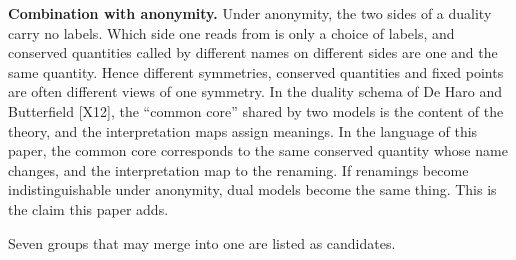 \documentclass[
  a4paper,
]{article}
\begin{document}
\textbf{Combination with anonymity.} Under anonymity, the two sides of a
duality carry no labels. Which side one reads from is only a choice of
labels, and conserved quantities called by different names on different
sides are one and the same quantity. Hence different symmetries,
conserved quantities and fixed points are often different views of one
symmetry. In the duality schema of De Haro and Butterfield {[}X12{]},
the ``common core'' shared by two models is the content of the theory,
and the interpretation maps assign meanings. In the language of this
paper, the common core corresponds to the same conserved quantity whose
name changes, and the interpretation map to the renaming. If renamings
become indistinguishable under anonymity, dual models become the same
thing. This is the claim this paper adds.

Seven groups that may merge into one are listed as candidates.
\end{document}
